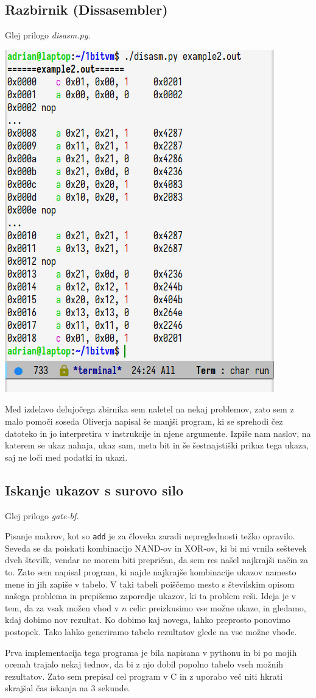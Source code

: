 \documentclass[12pt]{article}
\begin{document}
\subsection{Razbirnik (Dissasembler)}
Glej prilogo \textit{disasm.py}.


\begin{center}
  \includegraphics[width=.4\linewidth]{slike/razbirnik.png}
\end{center}
\hfill
Med izdelavo delujočega zbirnika sem naletel na nekaj problemov, zato sem z malo pomoči soseda Oliverja napisal še manjši program, ki se sprehodi čez datoteko in jo interpretira v instrukcije in njene argumente.
Izpiše nam naslov, na katerem se ukaz nahaja, ukaz sam, meta bit in še šestnajstiški prikaz tega ukaza, saj ne loči med podatki in ukazi.

\subsection{Iskanje ukazov s surovo silo}
Glej prilogo \textit{gate-bf}.

Pisanje makrov, kot so \texttt{add} je za človeka zaradi nepreglednosti težko opravilo.
Seveda se da poiskati kombinacijo NAND-ov in XOR-ov, ki bi mi vrnila seštevek dveh številk, vendar ne morem biti prepričan, da sem res našel najkrajši način za to.
Zato sem napisal program, ki najde najkrajše kombinacije ukazov namesto mene in jih zapiše v tabelo.
V taki tabeli poiščemo mesto s številskim opisom našega problema in prepišemo zaporedje ukazov, ki ta problem reši.
Ideja je v tem, da za vsak možen vhod v $n$ celic preizkusimo vse možne ukaze, in gledamo, kdaj dobimo nov rezultat.
Ko dobimo kaj novega, lahko preprosto ponovimo postopek.
Tako lahko generiramo tabelo rezultatov glede na vse možne vhode.

Prva implementacija tega programa je bila napisana v pythonu in bi po mojih ocenah trajalo nekaj tednov, da bi z njo dobil popolno tabelo vseh možnih rezultatov.
Zato sem prepisal cel program v C in z uporabo več niti hkrati skrajšal čas iskanja na 3 sekunde.
\end{document}
